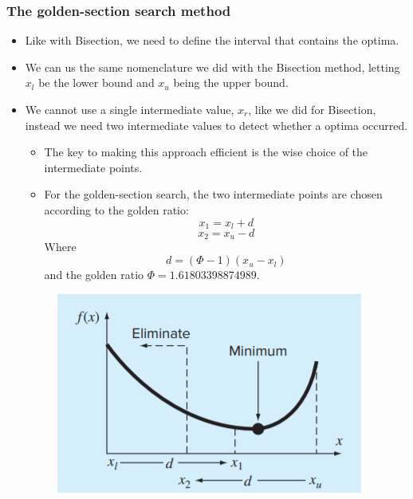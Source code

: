 \documentclass{if-beamer}
\begin{document}
\begin{frame}[t]
	\frametitle{The golden-section search method}
	\begin{itemize}
		\item Like with Bisection, we need to define the interval that contains the optima.
		\item We can us the same nomenclature we did with the Bisection method, letting $x_l$ be the lower bound and $x_u$ being the upper bound.
		\item We cannot use a single intermediate value, $x_r$, like we did for Bisection, instead we need two intermediate values to detect whether a optima occurred.  \\\vspace{3pt}
		\begin{minipage}{0.4\textwidth}
			\begin{itemize}
				\item The key to making this approach efficient is the wise choice of the intermediate points.
				\item For the golden-section search, the two intermediate points are chosen according to the golden ratio:
				$$x_1 = x_l + d $$
				$$x_2 = x_u - d $$
				Where
				$$d = (\Phi-1)(x_u-x_l)$$
				and the golden ratio $\Phi = 1.61803398874989 $.
			\end{itemize}
		\end{minipage}
		\begin{minipage}{0.5\textwidth}
			\begin{figure}
				\flushright
				\includegraphics[width = .95\textwidth]{figures/methoda}
			\end{figure}
		\end{minipage}
	\end{itemize}
\end{frame}
\end{document}
